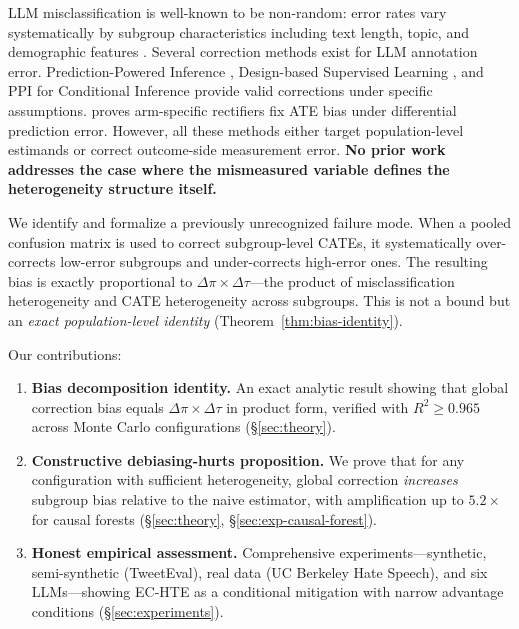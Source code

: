 \documentclass[11pt]{article}
\begin{document}
LLM misclassification is well-known to be non-random: error rates vary systematically by subgroup characteristics including text length, topic, and demographic features \citep{ashwin2025using}.
Several correction methods exist for LLM annotation error.
Prediction-Powered Inference \citep[PPI;][]{angelopoulos2023prediction}, Design-based Supervised Learning \citep[DSL;][]{egami2024using}, and PPI for Conditional Inference \citep[PPCI;][]{sui2026ppci} provide valid corrections under specific assumptions.
\citet{mozer2026bias} proves arm-specific rectifiers fix ATE bias under differential prediction error.
However, all these methods either target population-level estimands or correct outcome-side measurement error.
\textbf{No prior work addresses the case where the mismeasured variable defines the heterogeneity structure itself.}

We identify and formalize a previously unrecognized failure mode.
When a pooled confusion matrix is used to correct subgroup-level CATEs, it systematically over-corrects low-error subgroups and under-corrects high-error ones.
The resulting bias is exactly proportional to $\Delta\pi \times \Delta\tau$---the product of misclassification heterogeneity and CATE heterogeneity across subgroups.
This is not a bound but an \emph{exact population-level identity} (Theorem~\ref{thm:bias-identity}).

Our contributions:
\begin{enumerate}[nosep,leftmargin=*]
\item \textbf{Bias decomposition identity.} An exact analytic result showing that global correction bias equals $\Delta\pi \times \Delta\tau$ in product form, verified with $R^2 \geq 0.965$ across Monte Carlo configurations (\S\ref{sec:theory}).
\item \textbf{Constructive debiasing-hurts proposition.} We prove that for any configuration with sufficient heterogeneity, global correction \emph{increases} subgroup bias relative to the naive estimator, with amplification up to $5.2\times$ for causal forests (\S\ref{sec:theory}, \S\ref{sec:exp-causal-forest}).
\item \textbf{Honest empirical assessment.} Comprehensive experiments---synthetic, semi-synthetic (TweetEval), real data (UC Berkeley Hate Speech), and six LLMs---showing EC-HTE as a conditional mitigation with narrow advantage conditions (\S\ref{sec:experiments}).
\end{enumerate}

\end{document}
